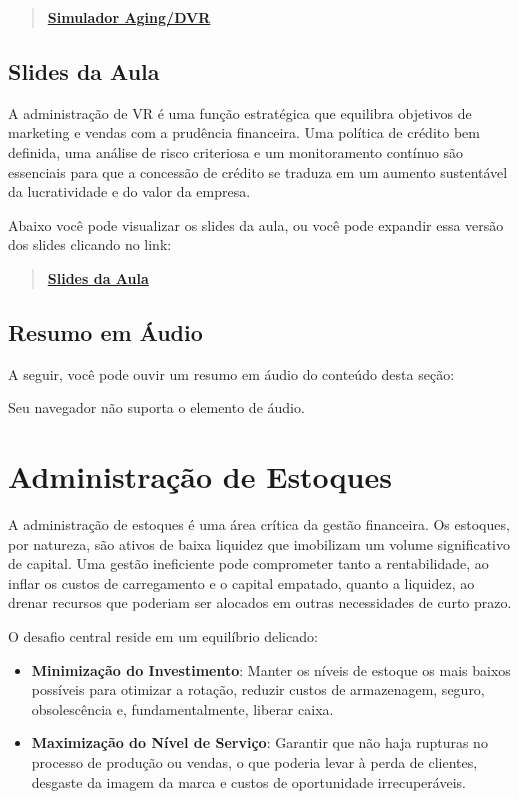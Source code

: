 \documentclass[
  a4paper,
]{book}
\begin{document}
\begin{quote}
\href{resources/04-aging-dvr.html}{\textbf{Simulador Aging/DVR}}
\end{quote}

\section{Slides da Aula}\label{slides-da-aula-1}

A administração de VR é uma função estratégica que equilibra objetivos
de marketing e vendas com a prudência financeira. Uma política de
crédito bem definida, uma análise de risco criteriosa e um monitoramento
contínuo são essenciais para que a concessão de crédito se traduza em um
aumento sustentável da lucratividade e do valor da empresa.

Abaixo você pode visualizar os slides da aula, ou você pode expandir
essa versão dos slides clicando no link:

\begin{quote}
\href{resources/04-credito-ppt.html}{\textbf{Slides da Aula}}
\end{quote}

\section{Resumo em Áudio}\label{resumo-em-uxe1udio-1}

A seguir, você pode ouvir um resumo em áudio do conteúdo desta seção:

Seu navegador não suporta o elemento de áudio.


\chapter{Administração de Estoques}\label{sec-estoque}

A administração de estoques é uma área crítica da gestão financeira. Os
estoques, por natureza, são ativos de baixa liquidez que imobilizam um
volume significativo de capital. Uma gestão ineficiente pode comprometer
tanto a rentabilidade, ao inflar os custos de carregamento e o capital
empatado, quanto a liquidez, ao drenar recursos que poderiam ser
alocados em outras necessidades de curto prazo.

O desafio central reside em um equilíbrio delicado:

\begin{itemize}
\item
  \textbf{Minimização do Investimento}: Manter os níveis de estoque os
  mais baixos possíveis para otimizar a rotação, reduzir custos de
  armazenagem, seguro, obsolescência e, fundamentalmente, liberar caixa.
\item
  \textbf{Maximização do Nível de Serviço}: Garantir que não haja
  rupturas no processo de produção ou vendas, o que poderia levar à
  perda de clientes, desgaste da imagem da marca e custos de
  oportunidade irrecuperáveis.
\end{itemize}
\end{document}
